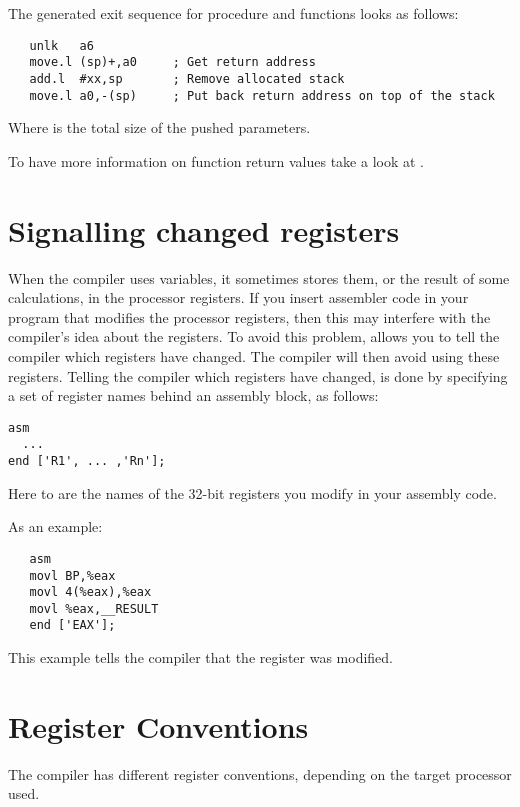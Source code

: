 The generated exit sequence for procedure and functions looks as follows:
\begin{verbatim}
   unlk   a6
   move.l (sp)+,a0     ; Get return address
   add.l  #xx,sp       ; Remove allocated stack
   move.l a0,-(sp)     ; Put back return address on top of the stack
\end{verbatim}

Where  is the total size of the pushed parameters.

To have more information on function return values take a look at
.



\section{Signalling changed registers}
\label{se:RegChanges}
When the compiler uses variables, it sometimes stores them, or the result of
some calculations, in the processor registers. If you insert assembler code
in your program that modifies the processor registers, then this may
interfere with the compiler's idea about the registers. To avoid this
problem, \fpc allows you to tell the compiler which registers have changed.
The compiler will then avoid using these registers. Telling the compiler
which registers have changed, is done by specifying a set of register names
behind an assembly block, as follows:
\begin{verbatim}
asm
  ...
end ['R1', ... ,'Rn'];
\end{verbatim}
Here  to  are the names of the 32-bit registers you
modify in your assembly code.

As an example:
\begin{verbatim}
   asm
   movl BP,%eax
   movl 4(%eax),%eax
   movl %eax,__RESULT
   end ['EAX'];
\end{verbatim}
This example tells the compiler that the  register was modified.

\section{Register Conventions}
\label{se:RegConvs}

The compiler has different register conventions, depending on the
target processor used.

